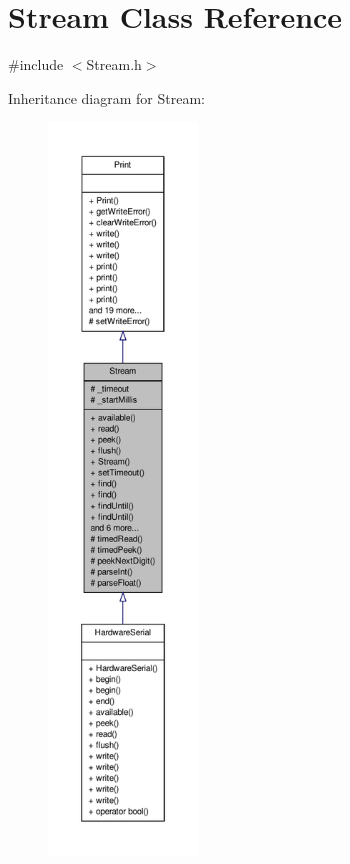 \hypertarget{class_stream}{\section{Stream Class Reference}
\label{class_stream}
}


{\ttfamily \#include $<$Stream.\-h$>$}



Inheritance diagram for Stream\-:
\nopagebreak
\begin{figure}[H]
\begin{center}
\leavevmode
\includegraphics[height=550pt]{class_stream__inherit__graph}
\end{center}
\end{figure}


